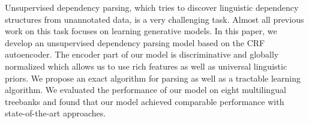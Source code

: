 Unsupervised dependency parsing, which tries to discover linguistic dependency structures from unannotated data, is a very challenging task. Almost all previous work on this task focuses on learning generative models. In this paper, we develop an unsupervised dependency parsing model based on the CRF autoencoder. The encoder part of our model is discriminative and globally normalized which allows us to use rich features as well as universal linguistic priors. We propose an exact algorithm for parsing as well as a tractable learning algorithm. We evaluated the performance of our model on eight multilingual treebanks and found that our model achieved comparable performance with state-of-the-art approaches.
